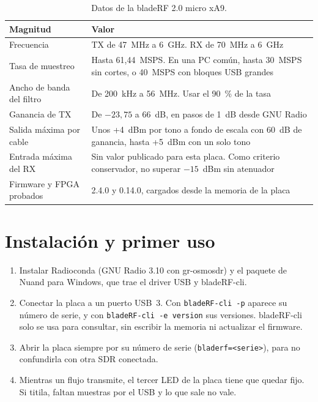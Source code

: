 \documentclass[11pt,a4paper]{article}
\begin{document}
\begin{table}[H]
  \centering
  \small
  \begin{tabular}{@{}L{4.6cm}L{9.4cm}@{}}
    \toprule
    Magnitud & Valor \\
    \midrule
    Frecuencia & TX de 47~MHz a 6~GHz. RX de 70~MHz a 6~GHz \\
    Tasa de muestreo & Hasta 61,44~MSPS. En una PC común, hasta 30~MSPS sin cortes, o 40~MSPS con bloques USB grandes \\
    Ancho de banda del filtro & De 200~kHz a 56~MHz. Usar el 90~\% de la tasa \\
    Ganancia de TX & De $-23{,}75$ a 66~dB, en pasos de 1~dB desde GNU Radio \\
    Salida máxima por cable & Unos +4~dBm por tono a fondo de escala con 60~dB de ganancia, hasta +5~dBm con un solo tono \\
    Entrada máxima del RX & Sin valor publicado para esta placa. Como criterio conservador, no superar $-15$~dBm sin atenuador \\
    Firmware y FPGA probados & 2.4.0 y 0.14.0, cargados desde la memoria de la placa \\
    \bottomrule
  \end{tabular}
  \caption{Datos de la bladeRF 2.0 micro xA9.}
\end{table}

\section{Instalación y primer uso}

\begin{enumerate}
  \item Instalar Radioconda (GNU Radio 3.10 con gr-osmosdr) y el paquete de Nuand para Windows, que trae el driver USB y bladeRF-cli.
  \item Conectar la placa a un puerto USB~3. Con \texttt{bladeRF-cli -p} aparece su número de serie, y con \texttt{bladeRF-cli -e version} sus versiones. bladeRF-cli solo se usa para consultar, sin escribir la memoria ni actualizar el firmware.
  \item Abrir la placa siempre por su número de serie (\texttt{bladerf=<serie>}), para no confundirla con otra SDR conectada.
  \item Mientras un flujo transmite, el tercer LED de la placa tiene que quedar fijo. Si titila, faltan muestras por el USB y lo que sale no vale.
\end{enumerate}
\end{document}
